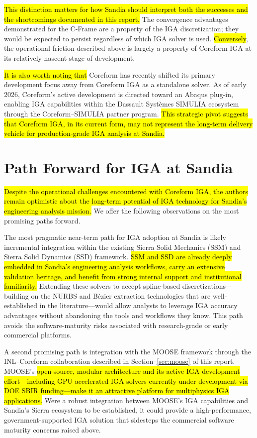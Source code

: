 \documentclass[12pt,report,justified]{SANDreport}
\begin{document}
\hl{This distinction matters for how Sandia should interpret both the successes and the
shortcomings documented in this report.}  The convergence advantages demonstrated for the
C-Frame are a property of the IGA discretization; they would be expected to persist
regardless of which IGA solver is used.  \hl{Conversely}, the operational
friction described above is largely a property of Coreform IGA at its relatively nascent  stage of
development.

\hl{It is also worth noting that} Coreform has recently shifted its primary development focus
away from Coreform IGA as a standalone solver.  As of early 2026, Coreform's active
development is directed toward an Abaqus plug-in, enabling IGA capabilities within the
Dassault Syst\`{e}mes SIMULIA ecosystem through the Coreform--SIMULIA partner program.
\hl{This strategic pivot suggests that Coreform IGA, in its current form, may not represent
the long-term delivery vehicle for production-grade IGA analysis at Sandia.}

\section{Path Forward for IGA at Sandia}

\hl{Despite the operational challenges encountered with Coreform IGA, the authors remain
optimistic about the long-term potential of IGA technology for Sandia's engineering
analysis mission.}  We offer the following observations on the most promising paths
forward.

The most pragmatic near-term path for IGA adoption at Sandia is likely incremental
integration within the existing Sierra Solid Mechanics (SSM) and Sierra Solid Dynamics
(SSD) framework.  \hl{SSM and SSD are already deeply embedded in Sandia's engineering
analysis workflows, carry an extensive validation heritage, and benefit from strong
internal support and institutional familiarity.}  Extending these solvers to accept
spline-based discretizations---building on the NURBS and B\'{e}zier extraction
technologies that are well-established in the literature---would allow analysts to
leverage IGA accuracy advantages without abandoning the tools and workflows they know.
This path avoids the software-maturity risks associated with research-grade or early
commercial platforms.

A second promising path is integration with the MOOSE framework through the
INL--Coreform collaboration described in Section~\ref{sec:moose} of this report.  MOOSE's
\hl{open-source, modular architecture and its active IGA development effort---including
GPU-accelerated IGA solvers currently under development via DOE SBIR funding---make it
an attractive platform for multiphysics IGA applications.}  Were a robust integration between
MOOSE's IGA capabilities and Sandia's Sierra ecosystem to be established, it could
provide a high-performance, government-supported IGA solution that sidesteps the
commercial software maturity concerns raised above.
\end{document}
